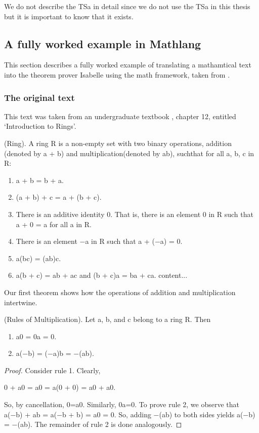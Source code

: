 We do not describe the TSa in detail since we do not use the TSa in this thesis but it is important to know that it exists.

\subsection{A fully worked example in Mathlang}

This section describes a fully worked example of translating a mathamtical text into the theorem prover Isabelle using the \gls{math} framework, taken from \cite{lamarphd}.

\subsubsection{The original text}

This text was taken from an undergraduate textbook \cite{joseph2002contemporary}, chapter 12, entitled `Introduction to Rings'.

\begin{tcolorbox}

\begin{defin}
(Ring). A ring R is a non-empty set with two binary operations, addition (denoted by a + b) and multiplication(denoted by ab), suchthat for all a, b, c in R:
\begin{enumerate}
\item a + b = b + a.
\item (a + b) + c = a + (b + c).
\item There is an additive identity 0. That is, there is an element 0 in R such that a + 0 = a for all a in R.
\item There is an element −a in R such that a + (−a) = 0.
\item a(bc) = (ab)c.
\item a(b + c) = ab + ac and (b + c)a = ba + ca.
content...
\end{enumerate}
Our first theorem shows how the operations of addition and
multiplication intertwine.
\end{defin}

\begin{thm}
(Rules of Multiplication). Let a, b, and c belong to a
ring R. Then
\begin{enumerate}
\item a0 = 0a = 0.
\item a(−b) = (−a)b = −(ab).
\end{enumerate}
\end{thm}

\begin{proof}
Consider rule 1. Clearly,

\begin{center}
0 + a0 = a0 = a(0 + 0) = a0 + a0.
\end{center}
So, by cancellation, 0=a0. Similarly, 0a=0.
To prove rule 2, we observe that a(−b) + ab = a(−b + b) = a0 =
0. So, adding −(ab) to both sides yields a(−b) = −(ab). The
remainder of rule 2 is done analogously.
\end{proof}
\end{tcolorbox}

